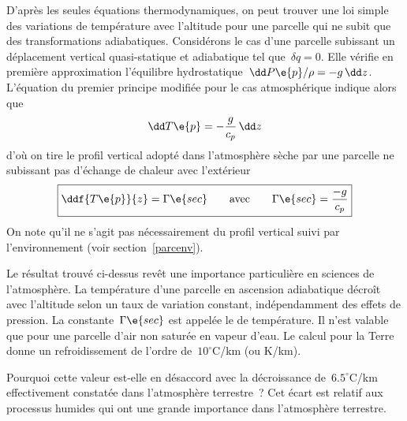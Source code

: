 \sk
D'après les seules équations thermodynamiques, on peut trouver une loi simple des variations de température avec l'altitude pour une parcelle qui ne subit que des transformations adiabatiques. Considérons le cas d'une parcelle subissant un déplacement vertical quasi-statique et adiabatique tel que~$\delta q = 0$. Elle vérifie en première approximation l'équilibre hydrostatique~$\dd P\e{p} / \rho = - g \, \dd z$. L'équation du premier principe modifiée pour le cas atmosphérique indique alors que
\[  \dd T\e{p}  = - \frac{g}{c_p} \, \dd z \]
d'où on tire le profil vertical adopté dans l'atmosphère sèche par une parcelle ne subissant pas d'échange de chaleur avec l'extérieur
\[  \boxed{ \ddf{T\e{p}}{z}  = \Gamma\e{sec} \qquad \text{avec} \qquad \Gamma\e{sec} = \frac{-g}{c_p} } \]
On note qu'il ne s'agit pas nécessairement du profil vertical suivi par l'environnement (voir section~\ref{parcenv}).

\sk
Le résultat trouvé ci-dessus revêt une importance particulière en sciences de l'atmosphère. La température d'une parcelle en ascension adiabatique décroît avec l'altitude selon un taux de variation constant, indépendamment des effets de pression. La constante~$\Gamma\e{sec}$ est appelée le  de température. Il n'est valable que pour une parcelle d'air non saturée en vapeur d'eau. Le calcul pour la Terre donne un refroidissement de l'ordre de~$10^{\circ}$C/km (ou K/km). 

\sk
Pourquoi cette valeur est-elle en désaccord avec la décroissance de~$6.5^{\circ}$C/km effectivement constatée dans l'atmosphère terrestre~? Cet écart est relatif aux processus humides qui ont une grande importance dans l'atmosphère terrestre.



